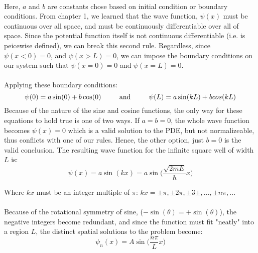 \documentclass[12pt,letterpaper]{book}
\begin{document}
\paragraph*{}Here, $a$ and $b$ are constants chose based on initial condition or boundary conditions. From chapter 1, we learned that the wave function, 
$\psi(x)$ must be continuous over all space, and must be continuously differentiable over all of space. Since the potential function itself is not continuous differentiable (i.e. is peicewise defined), we can break this second rule. Regardless, since $\psi(x<0) = 0 $, and $\psi(x > L) = 0$, we can impose the boundary conditions on our system such that $\psi(x=0) = 0$ and $\psi(x=L) = 0$.

\paragraph*{}Applying these boundary conditions:
\begin{equation}
\psi(0) = a \sin(0) + b \cos(0) 
\text{\hspace*{8mm} and \hspace*{8mm}}
\psi(L) = a \sin(kL) + b \\cos(kL)
\end{equation}
Because of the nature of the sine and cosine functions, the only way for these equations to hold true is one of two ways. If $a = b = 0$, the whole wave function becomes $\psi(x) = 0$ which is a valid solution to the PDE, but not normalizeable, thus conflicts with one of our rules. Hence, the other option, just $b = 0$ is the valid conclusion. The resulting wave function for the infinite square well of width $L$ is:
\begin{equation}
\psi(x) = a \sin(kx) = a \sin\Big(\frac{\sqrt{2mE}}{\hbar}x\Big)
\end{equation}
\begin{flushright}
Where $kx$ must be an integer multiple of $\pi$: $kx = \pm \pi , \pm 2\pi , \pm 3\pm , ... , \pm n\pi , ...$ 
\end{flushright}

\paragraph*{}Because of the rotational symmetry of sine, ($-\sin(\theta) = +\sin(\theta)$), the negative integers become redundant, and since the function must fit "neatly" into a region $L$, the distinct spatial solutions to the problem become:
\begin{equation}
\label{ISW spatial solution}
\psi_n(x) = A\sin \Big( \frac{n\pi}{L}x \Big)
\end{equation}
\end{document}
